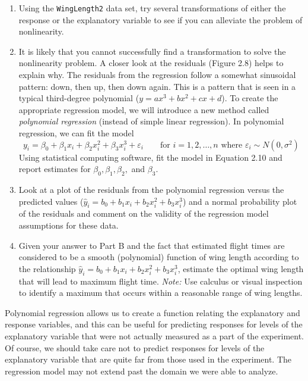 \documentclass[
]{book}
\begin{document}
\begin{enumerate}
  \begin{enumerate}
    \item Using the \texttt{WingLength2} data set, try several transformations of either the response or the explanatory variable to see if you can alleviate the problem of nonlinearity.
      \item It is likely that you cannot successfully find a transformation to solve the nonlinearity problem. A closer look at the residuals (Figure 2.8) helps to explain why. The residuals from the regression follow a somewhat sinusoidal pattern: down, then up, then down again. This is a pattern that is seen in a typical third-degree polynomial ($y = a x^3 + b x^2 + c x + d$). To create the appropriate regression model, we will introduce a new method called \textit{polynomial regression} (instead of simple linear regression). In polynomial regression, we can fit the model
      \[ \label{2.10}
        y_i = \beta_0 + \beta_1 x_i + \beta_2 x_i^2 + \beta_3 x_i^3 + \varepsilon_i \qquad \text{for } i = 1, 2, \ldots, n \text{ where } \varepsilon_i \sim N(0, \sigma^2)
        \tag{2.10}
      \]
      Using statistical computing software, fit the model in Equation 2.10 and report estimates for $\beta_0, \beta_1, \beta_2,$ and $\beta_3$.
      \item Look at a plot of the residuals from the polynomial regression versus the predicted values ($\hat{y}_i = b_0 + b_1 x_i + b_2 x_i^2 + b_3 x_i^3$) and a normal probability plot of the residuals and comment on the validity of the regression model assumptions for these data.
      \item Given your answer to Part B and the fact that estimated flight times are considered to be a smooth (polynomial) function of wing length according to the relationship $\hat{y}_i = b_0 + b_1 x_i + b_2 x_i^2 + b_3 x_i^3$, estimate the optimal wing length that will lead to maximum flight time. \textit{Note:} Use calculus or visual inspection to identify a maximum that occurs within a reasonable range of wing lengths.
    \end{enumerate}

Polynomial regression allows us to create a function relating the explanatory and response variables, and this can be useful for predicting responses for levels of the explanatory variable that were not actually measured as a part of the experiment. Of course, we should take care not to predict responses for levels of the explanatory variable that are quite far from those used in the experiment. The regression model may not extend past the domain we were able to analyze.

\end{enumerate}
\end{document}
